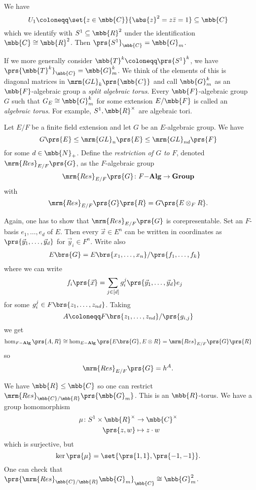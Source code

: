 \documentclass[10pt,a4paper,twoside,openany,hidelinks]{book}
\begin{document}
\begin{example}
We have
\[U_1 \coloneqq \set{z \in \mbb{C}}{\abs{z}^2 = z \bar{z} = 1} \subseteq \mbb{C}\]
which we identify with $S^1 \subseteq \mbb{R}^2$ under the identification $\mbb{C} \cong \mbb{R}^2$. Then $\prs{S^1}_{\mbb{C}} = \mbb{G}_m$.

If we more generally consider $\mbb{T}^k \coloneqq \prs{S^1}^k$, we have $\prs{\mbb{T}^k}_{\mbb{C}} = \mbb{G}_m^k$. We think of the elements of this is diagonal matrices in $\mrm{GL}_k\prs{\mbb{C}}$ and call $\mbb{G}_m^k$ as an $\mbb{F}$-algebraic group a \emph{split algebraic torus}. Every $\mbb{F}$-algebraic group $G$ such that $G_E \cong \mbb{G}_m^k$ for some extension $E/\mbb{F}$ is called an \emph{algebraic torus}. For example, $S^1, \mbb{R}^\times$ are algebraic tori.
\end{example}

\begin{definition}
Let $E/F$ be a finite field extension and let $G$ be an $E$-algebraic group. We have
\[G\prs{E} \leq \mrm{GL}_n\prs{E} \leq \mrm{GL}_{n d}\prs{F}\]
for some $d \in \mbb{N}_+$.
Define the \emph{restriction of $G$ to $F$}, denoted $\mrm{Res}_{E/F}\prs{G}$, as the $F$-algebraic group
\[\mrm{Res}_{E/F}\prs{G} \colon F\mbf{-Alg} \to \mbf{Group}\]
with
\[\mrm{Res}_{E/F}\prs{G}\prs{R} = G\prs{E \otimes_F R} \text{.}\]
\end{definition}

\begin{remark}
Again, one has to show that $\mrm{Res}_{E/F}\prs{G}$ is corepresentable.
Set an $F$-basis $e_1, \ldots, e_d$ of $E$. Then every $\vec{x} \in E^n$ can be written in coordinates as $\prs{\vec{y}_1, \ldots, \vec{y}_d}$ for $\vec{y}_i \in F^n$. Write also
\begin{align*}
E\brs{G} &= E\brs{x_1, \ldots, x_n}/\prs{f_1, \ldots, f_k}
\end{align*}
where we can write
\begin{align*}
f_i\prs{\vec{x}} &= \sum_{j \in [d]} g_i^j \prs{\vec{y}_1, \ldots, \vec{y}_d} e_j
\end{align*}
for some
$g_i^j \in F\brs{z_1, \ldots, z_{nd}}$.
Taking
\[A \coloneqq F\brs{z_1, \ldots, z_{nd}} / \prs{g_{i,j}}\]
we get
\[\hom_{{F}\mbf{-Alg}}\prs{A,R} \cong \hom_{E\mbf{-Alg}}\prs{E\brs{G}, E \otimes R} = \mrm{Res}_{E/F}\prs{G}\prs{R}\]
so
\[\mrm{Res}_{E/F}\prs{G} = h^A \text{.}\]
\end{remark}

\begin{example}
We have $\mbb{R} \leq \mbb{C}$ so one can restrict
$\mrm{Res}_{\mbb{C}/\mbb{R}}\prs{\mbb{G}_m}$.
This is an $\mbb{R}$-torus.
We have a group homomorphism
\begin{align*}
\mu \colon S^1  \times \mbb{R}^\times &\to \mbb{C}^\times \\
\prs{z,w} &\mapsto z \cdot w
\end{align*}
which is surjective, but
\[\ker\prs{\mu} = \set{\prs{1,1}, \prs{-1,-1}} \text{.}\]
One can check that $\prs{\mrm{Res}_{\mbb{C}/\mbb{R}} \mbb{G}_m}_{\mbb{C}} \cong \mbb{G}_m^2$.
\end{example}
\end{document}

